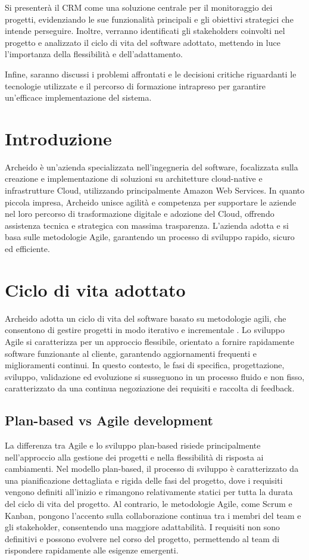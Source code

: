 \documentclass[target=bach,aauheader=,style=]{thud}
\begin{document}
\noindent Si presenterà il CRM come una soluzione centrale per il monitoraggio dei progetti, evidenziando le sue funzionalità principali e gli obiettivi strategici che intende perseguire. Inoltre, verranno identificati gli stakeholders coinvolti nel progetto e analizzato il ciclo di vita del software adottato, mettendo in luce l'importanza della flessibilità e dell'adattamento. 

\noindent Infine, saranno discussi i problemi affrontati e le decisioni critiche riguardanti le tecnologie utilizzate e il percorso di formazione intrapreso per garantire un'efficace implementazione del sistema.

\section{Introduzione}
Archeido \cite{archeido2024} è un'azienda specializzata nell'ingegneria del software, focalizzata sulla creazione e implementazione di soluzioni su architetture cloud-native e infrastrutture Cloud, utilizzando principalmente Amazon Web Services. In quanto piccola impresa, Archeido unisce agilità e competenza per supportare le aziende nel loro percorso di trasformazione digitale e adozione del Cloud, offrendo assistenza tecnica e strategica con massima trasparenza. L'azienda adotta e si basa sulle metodologie Agile, garantendo un processo di sviluppo rapido, sicuro ed efficiente.

\section{Ciclo di vita adottato}
Archeido adotta un ciclo di vita del software basato su metodologie agili, che consentono di gestire progetti in modo iterativo e incrementale \cite{sommerville2015}. Lo sviluppo Agile si caratterizza per un approccio flessibile, orientato a fornire rapidamente software funzionante al cliente, garantendo aggiornamenti frequenti e miglioramenti continui. In questo contesto, le fasi di specifica, progettazione, sviluppo, validazione ed evoluzione si susseguono in un processo fluido e non fisso, caratterizzato da una continua negoziazione dei requisiti e raccolta di feedback.

\subsection{Plan-based vs Agile development}
La differenza tra Agile e lo sviluppo plan-based risiede principalmente nell'approccio alla gestione dei progetti e nella flessibilità di risposta ai cambiamenti. Nel modello plan-based, il processo di sviluppo è caratterizzato da una pianificazione dettagliata e rigida delle fasi del progetto, dove i requisiti vengono definiti all'inizio e rimangono relativamente statici per tutta la durata del ciclo di vita del progetto. Al contrario, le metodologie Agile, come Scrum \cite{schwaber2011scrum} e Kanban, pongono l'accento sulla collaborazione continua tra i membri del team e gli stakeholder, consentendo una maggiore adattabilità. I requisiti non sono definitivi e possono evolvere nel corso del progetto, permettendo al team di rispondere rapidamente alle esigenze emergenti.
\end{document}
